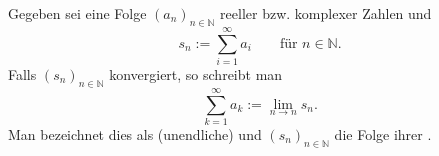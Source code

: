 Gegeben sei eine Folge $(a_n)_{n \in \mathbb{N}}$ reeller bzw. komplexer Zahlen und
$$s_n := \sum_{i=1}^\infty a_i \qquad \text{für $n \in \mathbb{N}$.}$$
Falls $(s_n)_{n \in \mathbb{N}}$ konvergiert, so schreibt man
$$\sum_{k=1}^\infty a_k := \lim_{n \to n} s_n.$$
Man bezeichnet dies als (unendliche)  und $(s_n)_{n \in \mathbb{N}}$ die Folge ihrer .